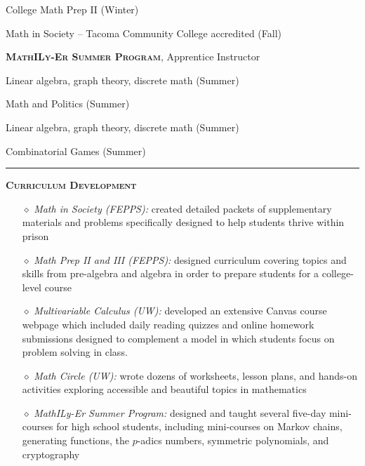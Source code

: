 \documentclass[12pt]{article}
\newcommand{\sectionheading}[1]
	{\bigskip %
	\noindent
	\hspace{-6.5mm}\textcolor{Gray}{\rule[.75mm]{21.5mm}{1mm}}
	\hspace{.2mm}	%
	{\large{\textbf{\textsc{#1}}}} %
}
\newenvironment{date_section}
	{
	\vspace{-1ex}
	\leftmargini = 15ex
	 \begin{itemize}[
		 labelsep = *,
		 labelwidth = 9ex,
		 labelindent = 0ex,
		 itemindent = !,
		 font=\normalfont, 
		 align=parleft
		 ]
		{}
		\itemsep=-1.5mm}
	{\end{itemize}\vspace{-2ex}}
\newcommand{\yearsingle}[2]{
			\item[  
				{\makebox[.0005ex][r]{#1}}
				\hspace{2ex}
				{\makebox[.05ex][l]{#2} }
				] }
\begin{document}
\begin{date_section}
	           	\yearsingle{}{}
	           					College Math Prep II (Winter)
	           \yearsingle{}{2017}
	           		Math in Society -- Tacoma Community College accredited    (Fall)	           		          		
	           \vspace{.3cm}
	           \yearsingle{}{}\textbf{\textsc{MathILy-Er Summer Program}}, Apprentice Instructor
	           \yearsingle{}{2018}
		           Linear algebra, graph theory, discrete math (Summer)
		            \yearsingle{}{}
		            Math and Politics (Summer)
	           \yearsingle{}{2017}
		           	Linear algebra, graph theory, discrete math (Summer)
		           	\yearsingle{}{}
		           Combinatorial Games	(Summer)		
		
			\end{date_section}

			\sectionheading{Curriculum Development} %
\vspace{-1ex}
			\begin{itemize}[leftmargin = 2.7cm]
			\itemsep=.25mm
			\item[$\diamond$] \textit{Math in Society (FEPPS):} created detailed packets of supplementary materials and problems specifically designed to help students thrive within prison 
			\item[$\diamond$] \textit{Math Prep II and III (FEPPS):} designed curriculum covering topics and skills from pre-algebra and algebra in order to prepare students for a college-level course
			\item[$\diamond$] \textit{Multivariable Calculus (UW):} developed an extensive Canvas course webpage which included daily reading quizzes and online homework submissions designed to complement a model in which students focus on problem solving in class.
			\item[$\diamond$] \textit{Math Circle (UW):} wrote dozens of worksheets, lesson plans, and hands-on activities exploring accessible and beautiful topics in mathematics
			\item[$\diamond$] \textit{MathILy-Er Summer Program:} designed and taught several five-day mini-courses for high school students, including mini-courses on Markov chains, generating functions, the $p$-adics numbers, symmetric polynomials, and cryptography
			\end{itemize}
\end{document}
